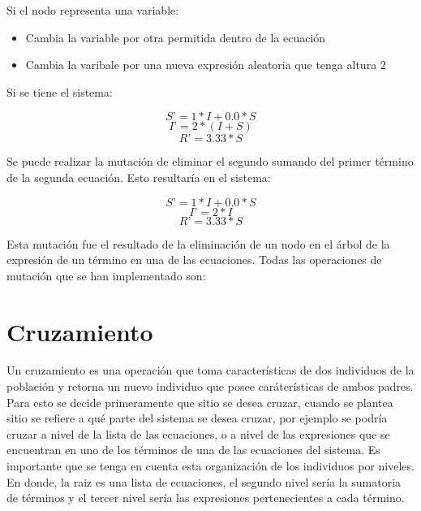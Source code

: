 \begin{itemize}
\begin{center}
\begin{adjustbox}{width=0.25\textwidth, keepaspectratio}
%
              \end{adjustbox}
          \end{center}

\end{itemize}

Si el nodo representa una variable:

\begin{itemize}
    \item Cambia la variable por otra permitida dentro de la ecuación
    \item Cambia la varibale por una nueva expresión aleatoria que tenga altura 2
\end{itemize}



Si se tiene el sistema:

$$S’ = 1 * I + 0.0 * S$$
$$I’ = 2 * (I + S)$$
$$R’ = 3.33 * S$$

Se puede realizar la mutación de eliminar el segundo sumando del primer término de la segunda ecuación. Esto resultaría en el sistema:

$$S’ = 1 * I + 0.0 * S$$
$$I’ = 2 * I$$
$$R’ = 3.33 * S$$

Esta mutación fue el resultado de la eliminación de un nodo en el árbol de la expresión de un término en una de las ecuaciones. Todas las operaciones de mutación que se han implementado son:






\section{Cruzamiento}

Un cruzamiento es una operación que toma características de dos individuos de la población y retorna un nuevo individuo que posee caráterísticas de ambos padres. Para esto se decide primeramente que sitio se desea cruzar, cuando se plantea sitio se refiere a qué parte del sistema se desea cruzar, por ejemplo se podría cruzar a nivel de la lista de las ecuaciones, o a nivel de las expresiones que se encuentran en uno de los términos de una de las ecuaciones del sistema. Es importante que se tenga en cuenta esta organización de los individuos por niveles. En donde, la raiz es una lista de ecuaciones, el segundo nivel sería la sumatoria de términos y el tercer nivel sería las expresiones pertenecientes a cada término.


